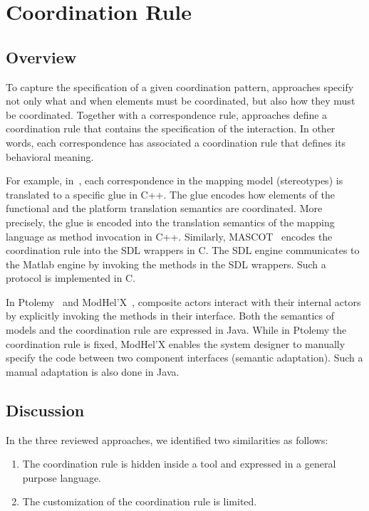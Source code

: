 \section{Coordination Rule}
\subsection{Overview}
To capture the specification of a given coordination pattern, approaches specify not only what and when elements must be coordinated, but also how they must be coordinated. Together with a correspondence rule, approaches define a coordination rule that contains the specification of the interaction. In other words, each correspondence has associated a coordination rule that defines its behavioral meaning. 

For example, in~\cite{dinatale}, each correspondence in the mapping model (\ie stereotypes) is translated to a specific glue in C++. The glue encodes how elements of the functional and the platform translation semantics are coordinated. More precisely, the glue is encoded into the translation semantics of the mapping language as method invocation in C++. Similarly, MASCOT~\cite{mascotbib} encodes the coordination rule into the SDL wrappers in C. The SDL engine communicates to the Matlab engine by invoking the methods in the SDL wrappers. Such a protocol is implemented in C. 
			
In Ptolemy~\cite{ptoleframebib} and ModHel'X~\cite{modhelxbib}, composite actors interact with their internal actors by explicitly invoking the methods in their interface. Both the semantics of models and the coordination rule are expressed in Java. While in Ptolemy the coordination rule is fixed, ModHel'X enables the system designer to manually specify the code between two component interfaces (\ie semantic adaptation). Such a manual adaptation is also done in Java.

\subsection{Discussion}
In the three reviewed approaches, we identified two similarities as follows:
	
\begin{enumerate}
\item The coordination rule is hidden inside a tool and expressed in a general purpose language.
\item The customization of the coordination rule is limited.
\end{enumerate}
		
